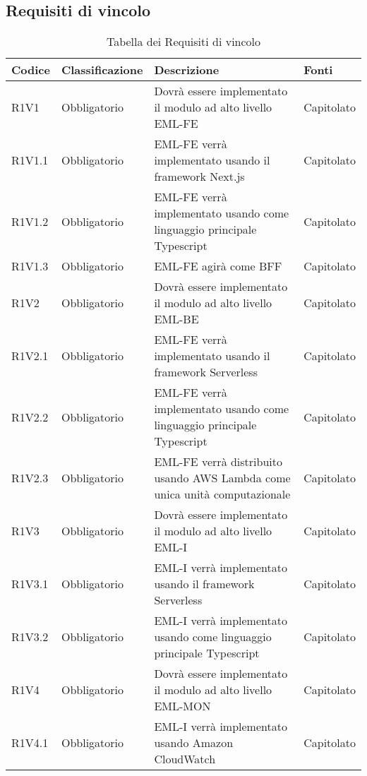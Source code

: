 \subsection{Requisiti di vincolo}

{


\centering
\renewcommand{\arraystretch}{2}
\begin{longtable}{C{2.5cm} C{2.8cm} C{6.7cm} C{2.5cm}}
\caption{Tabella dei Requisiti di vincolo}\\
\textbf{Codice} &
\textbf{Classificazione}&
\textbf{Descrizione}&
\textbf{Fonti}\\
\endhead


R1V1 & Obbligatorio & Dovrà essere implementato il modulo ad alto livello EML-FE & Capitolato \\
R1V1.1 & Obbligatorio & EML-FE verrà implementato usando il framework Next.js & Capitolato \\
R1V1.2 & Obbligatorio & EML-FE verrà implementato usando come linguaggio principale Typescript & Capitolato \\
R1V1.3 & Obbligatorio & EML-FE agirà come BFF & Capitolato \\


R1V2 & Obbligatorio & Dovrà essere implementato il modulo ad alto livello EML-BE & Capitolato \\
R1V2.1 & Obbligatorio & EML-FE verrà implementato usando il framework Serverless & Capitolato \\
R1V2.2 & Obbligatorio & EML-FE verrà implementato usando come linguaggio principale Typescript & Capitolato \\
R1V2.3 & Obbligatorio & EML-FE verrà distribuito usando AWS Lambda come unica unità computazionale & Capitolato \\


R1V3 & Obbligatorio & Dovrà essere implementato il modulo ad alto livello EML-I & Capitolato \\
R1V3.1 & Obbligatorio & EML-I verrà implementato usando il framework Serverless & Capitolato \\
R1V3.2 & Obbligatorio & EML-I verrà implementato usando come linguaggio principale Typescript & Capitolato \\

R1V4 & Obbligatorio & Dovrà essere implementato il modulo ad alto livello EML-MON & Capitolato \\
R1V4.1 & Obbligatorio & EML-I verrà implementato usando Amazon CloudWatch & Capitolato \\


\end{longtable}}
